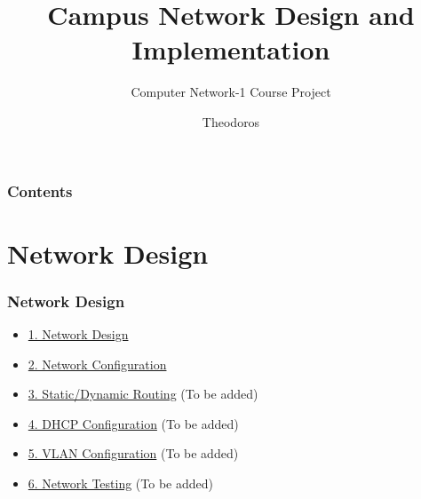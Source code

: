 \documentclass{beamer}
\title{Campus Network Design and Implementation}
\subtitle{Computer Network-1 Course Project}
\author{Theodoros}
\institute{Contributors: }
\begin{document}
\frame{\titlepage}

\begin{frame}
\frametitle{Contents}
\tableofcontents
\end{frame}

\section{Network Design}
\begin{frame}
\frametitle{Network Design}
\begin{itemize}
    \item \hyperlink{design}{1. Network Design}
    \item \hyperlink{config}{2. Network Configuration}
    \item \hyperlink{routing}{3. Static/Dynamic Routing} (To be added)
    \item \hyperlink{dhcp}{4. DHCP Configuration} (To be added)
    \item \hyperlink{vlans}{5. VLAN Configuration} (To be added)
    \item \hyperlink{testing}{6. Network Testing} (To be added)
\end{itemize}
\end{frame}
\end{document}
